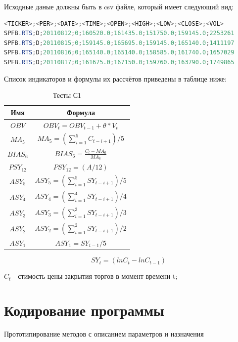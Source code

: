 \documentclass[a4paper,12pt]{article}
\begin{document}
Исходные даные должны быть в csv файле, который имеет следующий вид:
\begin{lstlisting}[language=Java, caption=формат исходного файла, label=listing:CSV]
<TICKER>;<PER>;<DATE>;<TIME>;<OPEN>;<HIGH>;<LOW>;<CLOSE>;<VOL>
SPFB.RTS;D;20110812;0;160520.0;161435.0;151750.0;159145.0;2253261
SPFB.RTS;D;20110815;0;159145.0;165695.0;159145.0;165140.0;1411197
SPFB.RTS;D;20110816;0;165140.0;165140.0;158585.0;161740.0;1657029
SPFB.RTS;D;20110817;0;161675.0;167150.0;159760.0;163790.0;1749865
\end{lstlisting}

Список индикаторов и формулы их рассчётов приведены в таблице ниже:
\begin{table}[h]
	\caption{Тесты С1}
	\centering
	\begin{tabular}{|c|c|}
	\hline
	Имя & Формула \\
	\hline
	$OBV$ & $OBV_t = OBV_{t-1} + \theta * V_t$ \\
	\hline
	$MA_5$ & $MA_5 = (\sum\limits_{i=1}^5 C_{t-i+1}) / 5$ \\
	\hline
	$ BIAS_6 $ & $ BIAS_6 = \frac {C_t - MA_6} {MA_6} $ \\
	\hline
	$ PSY_{12} $ & $ PSY_{12} = (A/12)$ \\
	\hline
	$ ASY_5 $ & $ ASY_5 = (\sum\limits_{i=1}^{5} SY_{t-i+1}) / 5$ \\
	\hline
	$ ASY_4 $ & $ ASY_4 = (\sum\limits_{i=1}^{4} SY_{t-i+1}) / 4$ \\
	\hline
	$ ASY_3 $ & $ ASY_3 = (\sum\limits_{i=1}^{3} SY_{t-i+1}) / 3$ \\
	\hline
	$ ASY_2 $ & $ ASY_2 = (\sum\limits_{i=1}^{2} SY_{t-i+1}) / 2$ \\
	\hline
	$ ASY_1 $ & $ ASY_1 = SY_{t-1} / 5$ \\
	\hline
	\end{tabular} 
\label{table:indicators} 
\end{table}

%			

$$ SY_t = (ln C_t - ln C_{t-1}) $$

$C_t$ - стимость цены закрытия торгов в момент времени t;

\newpage\section{Кодирование программы}
Прототипирование методов с описанием параметров и назначения
\end{document}
